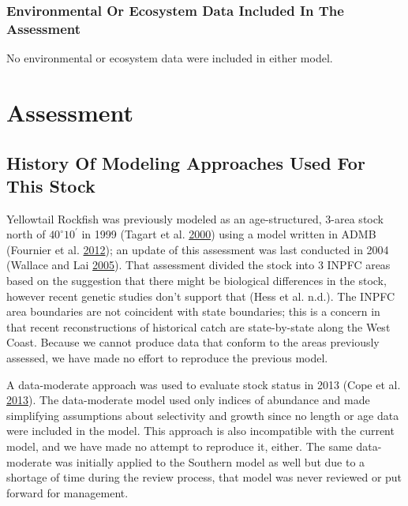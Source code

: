 \documentclass[12pt,]{article}
\begin{document}
\subsubsection{Environmental Or Ecosystem Data Included In The
Assessment}\label{environmental-or-ecosystem-data-included-in-the-assessment}

No environmental or ecosystem data were included in either model.

\newpage

\section{Assessment}\label{assessment}

\subsection{History Of Modeling Approaches Used For This
Stock}\label{history-of-modeling-approaches-used-for-this-stock}

Yellowtail Rockfish was previously modeled as an age-structured, 3-area
stock north of \(40^\circ 10^\prime\) in 1999 (Tagart et al.
\protect\hyperlink{ref-Tagart2000}{2000}) using a model written in ADMB
(Fournier et al. \protect\hyperlink{ref-Fournier2012}{2012}); an update
of this assessment was last conducted in 2004 (Wallace and Lai
\protect\hyperlink{ref-Wallace2005}{2005}). That assessment divided the
stock into 3 INPFC areas based on the suggestion that there might be
biological differences in the stock, however recent genetic studies
don't support that (Hess et al. n.d.). The INPFC area boundaries are not
coincident with state boundaries; this is a concern in that recent
reconstructions of historical catch are state-by-state along the West
Coast. Because we cannot produce data that conform to the areas
previously assessed, we have made no effort to reproduce the previous
model.

A data-moderate approach was used to evaluate stock status in 2013 (Cope
et al. \protect\hyperlink{ref-Cope2013}{2013}). The data-moderate model
used only indices of abundance and made simplifying assumptions about
selectivity and growth since no length or age data were included in the
model. This approach is also incompatible with the current model, and we
have made no attempt to reproduce it, either. The same data-moderate was
initially applied to the Southern model as well but due to a shortage of
time during the review process, that model was never reviewed or put
forward for management.
\end{document}
